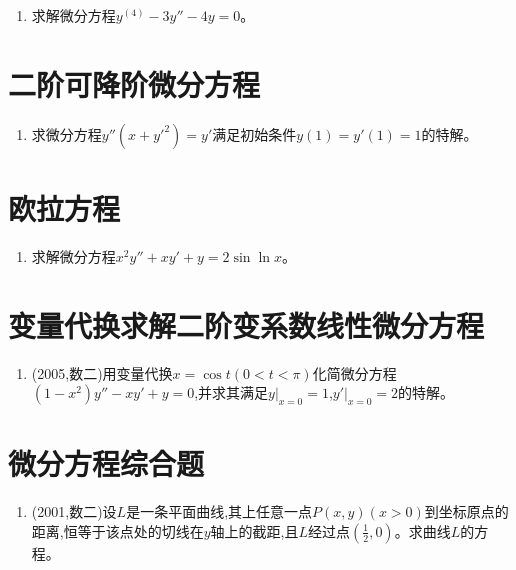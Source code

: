 \documentclass[12pt, a4paper, oneside, UTF8]{ctexbook}
\begin{document}
\begin{enumerate}[label=\arabic*.,start=12]
    \item 求解微分方程$y^{(4)}-3y''-4y=0$。
    
    \begin{solution}
    \newpage
    \end{solution}
\end{enumerate}

\section{ 二阶可降阶微分方程}
\begin{enumerate}[label=\arabic*.,start=13]
    \item 求微分方程$y''(x+y'^2)=y'$满足初始条件$y(1)=y'(1)=1$的特解。
    
    \begin{solution}
    
    \end{solution}
\end{enumerate}

\section{ 欧拉方程}

\begin{enumerate}[label=\arabic*.,start=14]
    \item 求解微分方程$x^2y''+xy'+y=2\sin\ln x$。
    
    \begin{solution}
    \newpage
    \end{solution}
\end{enumerate}

\section{ 变量代换求解二阶变系数线性微分方程}

\begin{enumerate}[label=\arabic*.,start=17]
    \item (2005,数二)用变量代换$x=\cos t(0<t<\pi)$化简微分方程$(1-x^2)y''-xy'+y=0$,并求其满足$y|_{x=0}=1$,$y'|_{x=0}=2$的特解。
    
    \begin{solution}
    \newpage
    \end{solution}
\end{enumerate}

\section{ 微分方程综合题}
\begin{enumerate}[label=\arabic*.,start=18]
    \item (2001,数二)设$L$是一条平面曲线,其上任意一点$P(x,y)(x>0)$到坐标原点的距离,恒等于该点处的切线在$y$轴上的截距,且$L$经过点$(\frac{1}{2},0)$。求曲线$L$的方程。
    
    \begin{solution}
    \newpage
    \end{solution}
\end{enumerate}
\end{document}
